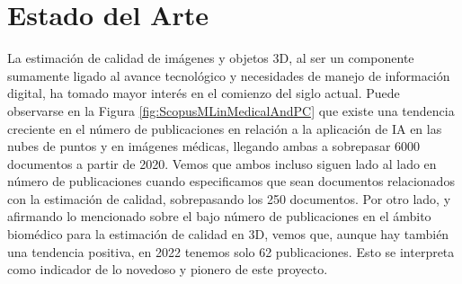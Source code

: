 \chapter{Estado del Arte}
\label{sec:EstadoDelArte}
La estimación de calidad de imágenes y objetos 3D, al ser un componente sumamente 
ligado al avance tecnológico y necesidades de manejo de información digital, ha 
tomado mayor interés en el comienzo del siglo actual.
Puede observarse en la Figura \ref{fig:ScopusMLinMedicalAndPC} que existe 
una tendencia creciente en el número de publicaciones en relación a la aplicación 
de IA en las nubes de puntos y en imágenes médicas, llegando
ambas a sobrepasar 6000 documentos a partir de 2020.  Vemos que ambos incluso siguen 
lado al lado en número de publicaciones cuando especificamos que sean documentos 
relacionados con la estimación de calidad, sobrepasando los 250 documentos. 
Por otro lado, y afirmando lo mencionado sobre el bajo número de publicaciones 
en el ámbito biomédico para la estimación de calidad en 3D, vemos que, aunque hay
también una tendencia positiva, en 2022 tenemos solo 62 publicaciones. Esto 
se interpreta como indicador de lo novedoso y pionero de este proyecto.
